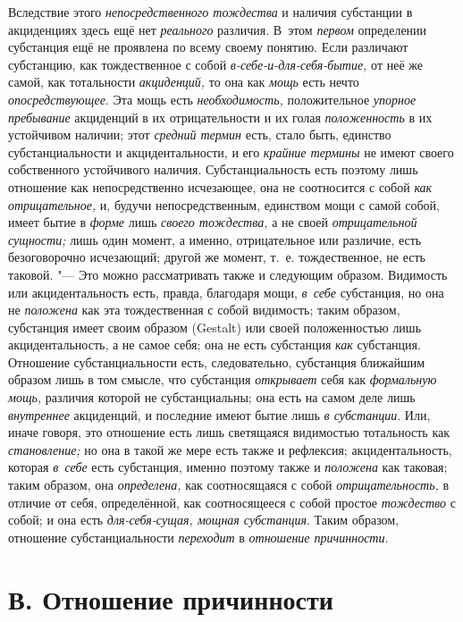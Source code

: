Вследствие этого {\em непосредственного тождества} и
наличия субстанции в акциденциях здесь ещё нет
{\em реального} различия. В~этом
{\em первом} определении субстанция ещё не проявлена по
всему своему понятию. Если различают субстанцию, как тождественное с собой
{\em в-себе-и-для-себя-бытие,} от неё же самой, как
тотальности {\em акциденций,} то она как
{\em мощь} есть нечто
{\em опосредствующее}. Эта мощь есть
{\em необходимость,} положительное
{\em упорное пребывание} акциденций в их
отрицательности и их голая {\em положенность} в их
устойчивом наличии; этот {\em средний термин} есть,
стало быть, единство субстанциальности и акцидентальности, и его
{\em крайние термины} не имеют своего собственного
устойчивого наличия. Субстанциальность есть поэтому лишь отношение как
непосредственно исчезающее, она не соотносится с собой
{\em как отрицательное,} и, будучи непосредственным,
единством мощи с самой собой, имеет бытие в {\em форме}
лишь {\em своего тождества,} а не своей
{\em отрицательной сущности;} лишь один момент, а
именно, отрицательное или различие, есть безоговорочно исчезающий; другой
же момент, т.~е. тождественное, не есть таковой. "--- Это можно рассматривать
также и следующим образом. Видимость или акцидентальность есть, правда,
благодаря мощи, {\em в~себе} субстанция, но она не
{\em положена} как эта тождественная с собой видимость;
таким образом, субстанция имеет своим образом (Gestalt) или своей
положенностью лишь акцидентальность, а не самое себя; она не есть
субстанция {\em как} субстанция. Отношение
субстанциальности есть, следовательно, субстанция ближайшим образом лишь в
том смысле, что субстанция {\em открывает} себя как
{\em формальную мощь,} различия которой не
субстанциальны; она есть на самом деле лишь
{\em внутреннее} акциденций, и последние имеют бытие
лишь {\em в субстанции}. Или, иначе говоря, это
отношение есть лишь светящаяся видимостью тотальность как
{\em становление;} но она в такой же мере есть также и
рефлексия; акцидентальность, которая {\em в~себе} есть
субстанция, именно поэтому также и {\em положена} как
таковая; таким образом, она {\em определена,} как
соотносящаяся с собой {\em отрицательность,} в отличие
от себя, определённой, как соотносящееся с собой простое
{\em тождество} с собой; и она есть {\em для-себя-сущая, мощная
субстанция}. Таким образом, отношение субстанциальности
{\em переходит} в {\em отношение причинности}.


\section[В. Отношение причинности]{В. Отношение причинности}

